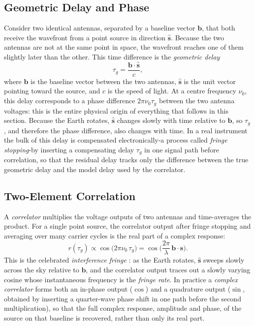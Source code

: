 \subsection{Geometric Delay and Phase}
\label{subsec:geometric-delay}
Consider two identical antennas, separated by a baseline vector $\bm{b}$, that
both receive the wavefront from a point source in direction $\hat{\bm{s}}$.
Because the two antennas are not at the same point in space, the wavefront
reaches one of them slightly later than the other. This time difference is
the \emph{geometric delay} \citep{taylor1999synthesis,tms2017}
\begin{equation}
  \tau_g = \frac{\bm{b}\cdot\hat{\bm{s}}}{c},
  \label{eq:taug}
\end{equation}
where $\bm{b}$ is the baseline vector between the two antennas, $\hat{\bm{s}}$
is the unit vector pointing toward the source, and $c$ is the speed of light.
At a centre frequency $\nu_0$, this delay corresponds to a phase difference
$2\pi\nu_0\tau_g$ between the two antenna voltages: this is the entire
physical origin of everything that follows in this section. Because the
Earth rotates, $\hat{\bm{s}}$ changes slowly with time relative to $\bm{b}$,
so $\tau_g$, and therefore the phase difference, also changes with time. In a
real instrument the bulk of this delay is compensated electronically-a
process called \emph{fringe stopping}-by inserting a compensating delay
$\tau_g$ in one signal path before correlation, so that the residual delay
tracks only the difference between the true geometric delay and the model
delay used by the correlator.

\subsection{Two-Element Correlation}
\label{subsec:two-element-correlation}
A \emph{correlator} multiplies the voltage outputs of two antennas and
time-averages the product. For a single point source, the correlator output
after fringe stopping and averaging over many carrier cycles is the real part
of a complex response:
\begin{equation}
  r(\tau_g) \propto \cos\!\big(2\pi\nu_0\,\tau_g\big)
            = \cos\!\Big(\frac{2\pi}{\lambda}\,\bm{b}\cdot\hat{\bm{s}}\Big).
  \label{eq:fringe}
\end{equation}
This is the celebrated \emph{interference fringe} \citep{taylor1999synthesis}:
as the Earth rotates, $\hat{\bm{s}}$ sweeps slowly across the sky relative to
$\bm{b}$, and the correlator output traces out a slowly varying cosine whose
instantaneous frequency is the \emph{fringe rate}. In practice a \emph{complex
correlator} forms both an in-phase output ($\cos$) and a quadrature output
($\sin$, obtained by inserting a quarter-wave phase shift in one path before
the second multiplication), so that the full complex response, amplitude and
phase, of the source on that baseline is recovered, rather than only its real
part.

